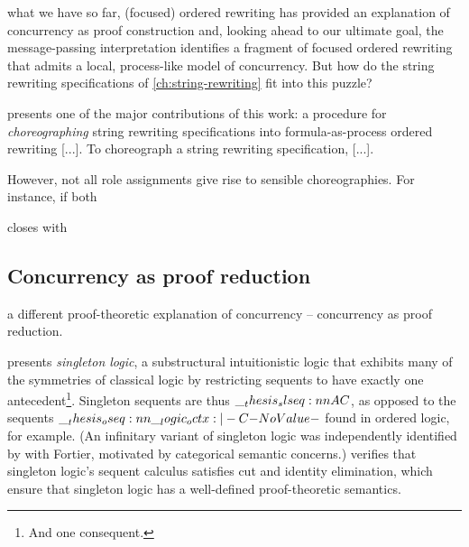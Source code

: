 

 what we have so far, (focused) ordered rewriting has provided an explanation of concurrency as proof construction and, looking ahead to our ultimate goal, the message-passing interpretation identifies a fragment of focused ordered rewriting that admits a local, process-like model of concurrency.
But how do the string rewriting specifications of \cref{ch:string-rewriting} fit into this puzzle?



 presents one of the major contributions of this work: a procedure for \emph{choreographing} string rewriting specifications into formula-as-process ordered rewriting [...].
To choreograph a string rewriting specification, [...].

However, not all role assignments give rise to sensible choreographies.
For instance, if both


 closes with


\subsection{Concurrency as proof reduction}

 a different proof-theoretic explanation of concurrency -- concurrency as proof reduction.

 presents \emph{singleton logic}, a substructural intuitionistic logic that exhibits many of the symmetries of classical logic by restricting sequents to have exactly one antecedent\footnote{And one consequent.}.
Singleton sequents are thus $\slseq{A |- C}$, as opposed to the sequents $\oseq{\octx |- C}$ found in ordered logic, for example.
(An infinitary variant of singleton logic was independently identified by \citeauthor{Santocanale:FOSSACS02} with Fortier\autocites{Santocanale:FOSSACS02}{Fortier+Santocanale:CSL13}, motivated by categorical semantic concerns.)
 verifies that singleton logic's sequent calculus satisfies cut and identity elimination, which ensure that singleton logic has a well-defined proof-theoretic semantics.


